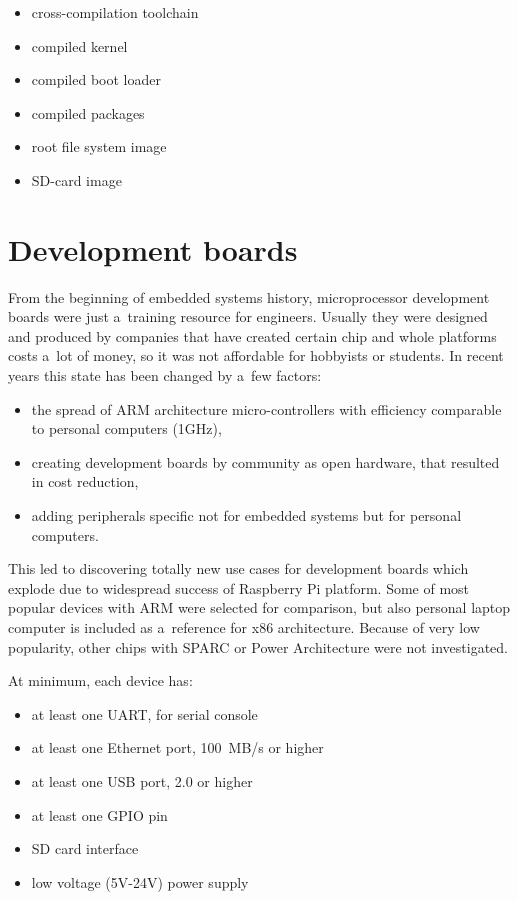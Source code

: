 \documentclass[printmode]{mgr}
\begin{document}
\begin{itemize}
    \item cross-compilation toolchain
    \item compiled kernel
    \item compiled boot loader
    \item compiled packages
    \item root file system image
    \item SD-card image
\end{itemize}



















\chapter{Development boards}
\label{section:development-boards}

From the beginning of embedded systems history, microprocessor development boards were just a~training resource for engineers.
Usually they were designed and produced by companies that have created certain chip and whole platforms costs a~lot of money, so it was not affordable for hobbyists or students.
In recent years this state has been changed by a~few factors:
\begin{itemize}
  \item the spread of ARM architecture micro-controllers with efficiency comparable to personal computers (1GHz),
  \item creating development boards by community as open hardware, that resulted in cost reduction,
  \item adding peripherals specific not for embedded systems but for personal computers.
\end{itemize}
This led to discovering totally new use cases for development boards which explode due to widespread success of Raspberry Pi platform.
Some of most popular devices with ARM were selected for comparison, but also personal laptop computer is included as a~reference for x86 architecture. Because of very low popularity, other chips with SPARC or Power Architecture were not investigated.

At minimum, each device has:
\begin{itemize}
  \item at least one UART, for serial console
  \item at least one Ethernet port, 100~MB/s or higher
  \item at least one USB port, 2.0 or higher
  \item at least one GPIO pin
  \item SD card interface
  \item low voltage (5V-24V) power supply
\end{itemize}
\end{document}
